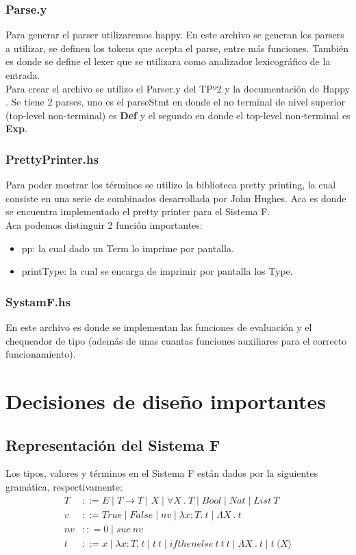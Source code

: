 \documentclass[12pt, titlepage, a4paper]{article}
\begin{document}
\subsubsection{Parse.y}
Para generar el parser utilizaremos happy. En este archivo se generan los parsers a utilizar, se definen los tokens que acepta el parse, 
entre más funciones. También es donde se define el lexer que se utilizara como analizador lexicográfico de la entrada. \\ 

Para crear el archivo se utilizo el Parser.y del TPº2 \cite{tp2:lambdaCalculoSimpleTipado} y la documentación de Happy \cite{haskellHappy}.
Se tiene 2 parses, uno es el parseStmt en donde el no terminal de nivel superior (top-level non-terminal) es \textbf{Def} y el 
segundo en donde el top-level non-terminal es \textbf{Exp}. \\

\subsubsection{PrettyPrinter.hs}
Para poder mostrar los términos se utilizo la biblioteca pretty printing, la cual consiste en una serie de combinados desarrollada por John Hughes. Aca es 
donde se encuentra implementado el pretty printer para el Sistema F. \\
Aca podemos distinguir 2 función importantes:
\begin{itemize}[label=$\bullet$]
  \item {pp: la cual dado un Term lo imprime por pantalla.}
  \item {printType: la cual se encarga de imprimir por pantalla los Type.}
\end{itemize}

\subsubsection{SystamF.hs}
En este archivo es donde se implementan las funciones de evaluación y el chequeador de tipo (además de unas cuantas funciones auxiliares 
para el correcto funcionamiento).

\section{Decisiones de diseño importantes}
\subsection{Representación del Sistema F}
Los tipos, valores y términos en el Sistema F están dados por la siguientes gramática, respectivamente:
\begin{align*}
    T &::= E \mid T \rightarrow T \mid X \mid \forall X \ . \ T \mid Bool \mid Nat \mid List \ T\\
    v &::= True \mid False \mid nv \mid \lambda x:T. \ t \mid \Lambda X \ . \ t \\
    nv &:: = 0 \mid suc \ nv \\
    t &::= x \mid \lambda x:T. \ t \mid t \ t \mid ifthenelse \ t \ t \ t \mid \Lambda X \ . \ t \mid t \ \langle X \rangle \\
\end{align*}
\end{document}
